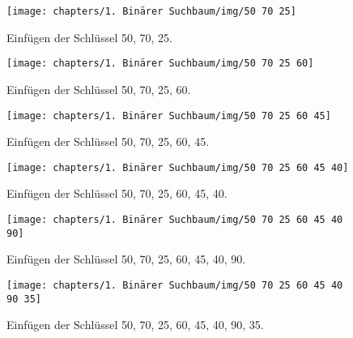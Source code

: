     \begin{figure}[h]
        \centering
    \texttt{[image: chapters/1. Binärer Suchbaum/img/50 70 25]}
    \caption{Einfügen der Schlüssel 50, 70, 25.}
        \vspace{64}
\end{figure}


\begin{figure}[h]
    \centering
    \texttt{[image: chapters/1. Binärer Suchbaum/img/50 70 25 60]}
    \caption{Einfügen der Schlüssel 50, 70, 25, 60.}

    \vspace{64}
\end{figure}

    \begin{figure}[h]
        \centering
    \texttt{[image: chapters/1. Binärer Suchbaum/img/50 70 25 60 45]}
    \caption{Einfügen der Schlüssel 50, 70, 25, 60, 45.}

    \vspace{64}
    \end{figure}

        \begin{figure}[h]
            \centering
    \texttt{[image: chapters/1. Binärer Suchbaum/img/50 70 25 60 45 40]}
    \caption{Einfügen der Schlüssel 50, 70, 25, 60, 45, 40.}
            \vspace{64}
\end{figure}

\begin{figure}[h]
    \centering
    \texttt{[image: chapters/1. Binärer Suchbaum/img/50 70 25 60 45 40 90]}
    \caption{Einfügen der Schlüssel 50, 70, 25, 60, 45, 40, 90.}

    \vspace{64}
\end{figure}

    \begin{figure}[h]
        \centering
    \texttt{[image: chapters/1. Binärer Suchbaum/img/50 70 25 60 45 40 90 35]}
    \caption{Einfügen der Schlüssel 50, 70, 25, 60, 45, 40, 90, 35.}

    \vspace{64}
    \end{figure}

